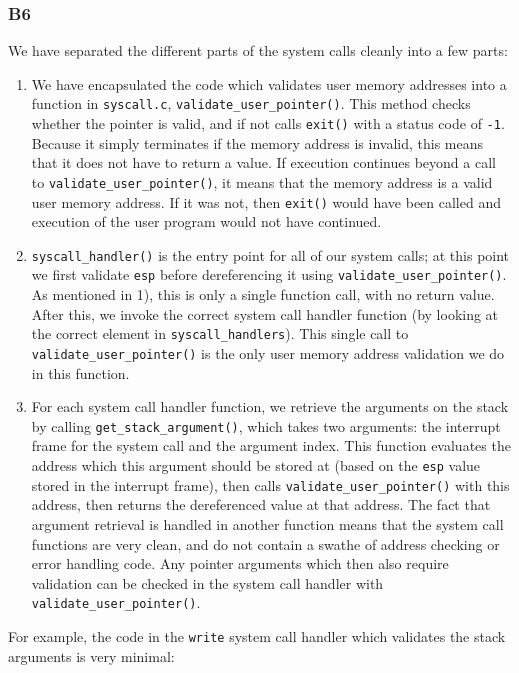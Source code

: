 \documentclass[a4wide, 11pt]{article}
\newcommand{\tx}{\texttt}
\begin{document}
\subsubsection{B6}

We have separated the different parts of the system calls cleanly into a few parts:

\begin{enumerate}
\item We have encapsulated the code which validates user memory addresses into a function in \tx{syscall.c}, \tx{validate\_user\_pointer()}. This method checks whether the pointer is valid, and if not calls \tx{exit()} with a status code of \tx{-1}. Because it simply terminates if the memory address is invalid, this means that it does not have to return a value. If execution continues beyond a call to \tx{validate\_user\_pointer()}, it means that the memory address is a valid user memory address. If it was not, then \tx{exit()} would have been called and execution of the user program would not have continued.
\item \tx{syscall\_handler()} is the entry point for all of our system calls; at this point we first validate \tx{esp} before dereferencing it using \tx{validate\_user\_pointer()}. As mentioned in 1), this is only a single function call, with no return value. After this, we invoke the correct system call handler function (by looking at the correct element in \tx{syscall\_handlers}). This single call to \tx{validate\_user\_pointer()} is the only user memory address validation we do in this function.
\item For each system call handler function, we retrieve the arguments on the stack by calling \tx{get\_stack\_argument()}, which takes two arguments: the interrupt frame for the system call and the argument index. This function evaluates the address which this argument should be stored at (based on the \tx{esp} value stored in the interrupt frame), then calls \tx{validate\_user\_pointer()} with this address, then returns the dereferenced value at that address. The fact that argument retrieval is handled in another function means that the system call functions are very clean, and do not contain a swathe of address checking or error handling code. Any pointer arguments which then also require validation can be checked in the system call handler with \tx{validate\_user\_pointer()}.
\end{enumerate}

For example, the code in the \tx{write} system call handler which validates the stack arguments is very minimal:
\end{document}
